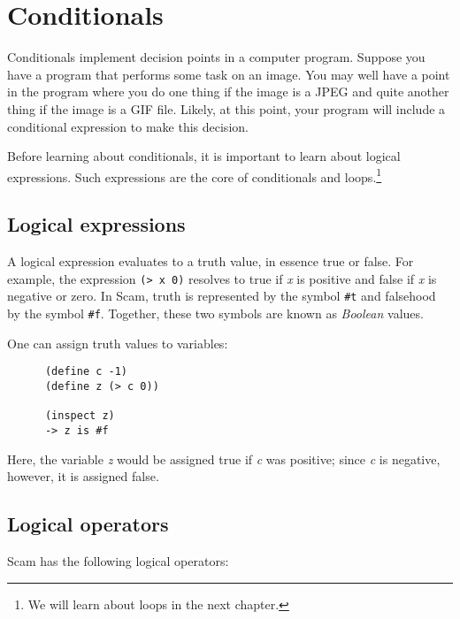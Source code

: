 \chapter{Conditionals}
\label{Conditionals}

Conditionals implement decision points in a computer program.
Suppose you have a program that performs some task on an
image. You may well have a point in the program where you
do one thing if the image is a JPEG and quite another
thing if the image is a GIF file. Likely, at this point,
your program will include a conditional expression to make
this decision.

Before learning about conditionals, it is important to
learn about logical expressions. Such expressions are the
core of conditionals and loops.\footnote{
We will learn about loops in the next chapter.
}

\section{Logical expressions}

A logical expression evaluates to a truth value, in essence true or
false. For example, the expression \verb!(> x 0)!
resolves to true if {\it x} is positive
and false if {\it x} is negative or zero. In Scam, truth is represented by
the symbol \verb!#t! and falsehood
by the symbol \verb!#f!.
Together,
these two symbols are known as {\it {\sc Boolean}} values.

One can assign truth values to variables:

\begin{verbatim}
      (define c -1)
      (define z (> c 0))

      (inspect z)
      -> z is #f
\end{verbatim}

Here, the variable {\it z} would be assigned true
if {\it c}  was positive;
since {\it c} is negative, however, it is assigned false.

\section{Logical operators}

Scam has the following logical operators:
 
